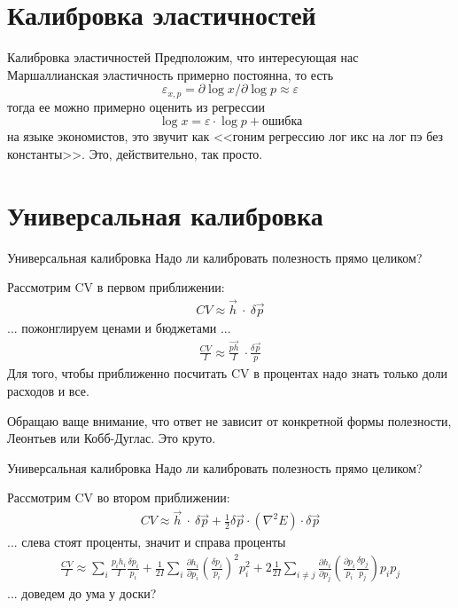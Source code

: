 \documentclass{beamer}
\begin{document}
\section{Калибровка эластичностей}

\begin{frame}{Калибровка эластичностей}
Предположим, что интересующая нас Маршаллианская эластичность примерно постоянна, то есть $$\varepsilon_{x,p} = \partial \log x/\partial \log p \approx \varepsilon$$ тогда ее можно примерно оценить из регрессии
$$\log x = \varepsilon \cdot \log p + \text{ошибка}$$
на языке экономистов, это звучит как <<гоним регрессию лог икс на лог пэ без константы>>. Это, действительно, так просто.
\end{frame}

\section{Универсальная калибровка}

\begin{frame}{Универсальная калибровка}
Надо ли калибровать полезность прямо целиком?

Рассмотрим CV в первом приближении:
\begin{gather}
	CV \approx \vec h \ \cdot \ \delta \vec p
\end{gather}
... пожонглируем ценами и бюджетами ...
\begin{gather*}
	\frac{CV}{I} \approx \frac{\vec {p h}}{I} \ \cdot \frac{\delta \vec p}{p}
\end{gather*}
Для того, чтобы приближенно посчитать CV в процентах надо знать только доли расходов и все. 

Обращаю ваще внимание, что ответ не зависит от конкретной формы полезности, Леонтьев или Кобб-Дуглас. Это круто.
\end{frame}

\begin{frame}{Универсальная калибровка}
Надо ли калибровать полезность прямо целиком?

Рассмотрим CV во втором приближении:
\begin{gather*}
	CV \approx \vec h \ \cdot \ \delta \vec p + \frac{1}{2} \delta \vec p \cdot (\nabla^2 E) \cdot \delta \vec p
\end{gather*}
... слева стоят проценты, значит и справа проценты
\begin{gather*}
	\frac{CV}{I} \approx \sum_i \frac{p_i h_i}{I} \frac{\delta p_i}{p_i}  + \frac{1}{2I}\sum_i \frac{\partial h_i}{\partial p_i} (\frac{\delta p_i}{p_i})^2p_i^2 + 2\frac{1}{2I}\sum_{i \neq j} \frac{\partial h_i}{\partial p_j} (\frac{\partial p_i}{p_i}\frac{\delta p_j}{p_j})p_ip_j
\end{gather*}
... доведем до ума у доски?
\end{frame}
\end{document}
